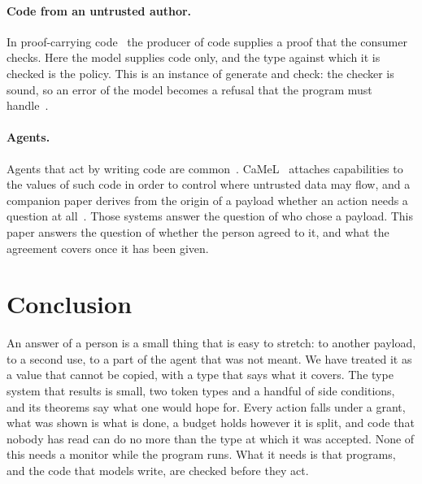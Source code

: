 \documentclass[acmsmall,nonacm,screen]{acmart}
\begin{document}
\paragraph{Code from an untrusted author.} In proof-carrying code~\citep{necula1997} the
producer of code supplies a proof that the consumer checks. Here the model supplies code only,
and the type against which it is checked is the policy. This is an instance of generate and
check: the checker is sound, so an error of the model becomes a refusal that the program must
handle~\citep{tpp3}.

\paragraph{Agents.} Agents that act by writing code are common~\citep{wang2024}.
CaMeL~\citep{debenedetti2025} attaches capabilities to the values of such code in order to
control where untrusted data may flow, and a companion paper derives from the origin of a
payload whether an action needs a question at all~\citep{tpp7}. Those systems answer the
question of who chose a payload. This paper answers the question of whether the person agreed
to it, and what the agreement covers once it has been given.

\section{Conclusion}

An answer of a person is a small thing that is easy to stretch: to another payload, to a second
use, to a part of the agent that was not meant. We have treated it as a value that cannot be
copied, with a type that says what it covers. The type system that results is small, two
token types and a handful of side conditions, and its theorems say what one would hope for. Every
action falls under a grant, what was shown is what is done, a budget holds however it is
split, and code that nobody has read can do no more than the type at which it was accepted.
None of this needs a monitor while the program runs. What it needs is that programs, and the
code that models write, are checked before they act.



\end{document}

